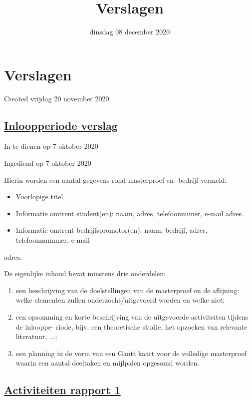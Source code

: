 \documentclass{scrartcl}
\title{Verslagen}
\date{dinsdag 08 december 2020}
\author{}
\begin{document}
\maketitle

		\section{Verslagen}

Created vrijdag 20 november 2020



\subsection{\href{./Verslagen/Inloopperiode_verslag.tex}{Inloopperiode verslag}}

In te dienen op 7 oktober 2020

Ingediend op 7 oktober 2020



Hierin worden een aantal gegevens rond masterproef en -bedrijf vermeld:

\begin{itemize}
\item Voorlopige titel.
\item Informatie omtrent student(en): naam, adres, telefoonnumer, e-mail adres.
\item Informatie omtrent bedrijfspromotor(en): naam, bedrijf, adres, telefoonmummer, e-mail
\end{itemize}
adres.

De eigenlijke inhoud bevat minstens drie onderdelen:

\begin{enumerate}[1]
\item een beschrijving van de doelstellingen van de masterproef en de aflijning: welke elementen zullen onderzocht/uitgevoerd worden en welke niet;
\item een opsomming en korte beschrijving van de uitgevoerde activiteiten tijdens de inlooppe- riode, bijv. een theoretische studie, het opzoeken van relevante literatuur, ...;
\item een planning in de vorm van een Gantt kaart voor de volledige masterproef waarin een aantal deeltaken en mijlpalen opgesomd worden.
\end{enumerate}


\subsection{\href{./Verslagen/Activiteiten_rapport/Activiteiten_rapport_1.tex}{Activiteiten rapport 1}}
\end{document}
